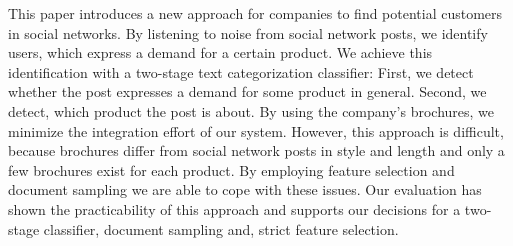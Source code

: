 
This paper introduces a new approach for companies to find potential customers in social networks.
By listening to noise from social network posts, we identify users, which express a demand for a certain product.
We achieve this identification with a two-stage text categorization classifier:
First, we detect whether the post  expresses a demand for some product in general.
Second, we detect, which product the post is about.
By using the company's brochures, we minimize the integration effort of our system.
However, this approach is difficult, because brochures differ from social network posts in style and length and only a few brochures exist for each product.
By employing feature selection and document sampling we are able to cope with these issues.
Our evaluation has shown the practicability of this approach and supports our decisions for a two-stage classifier, document sampling and, strict feature selection.
